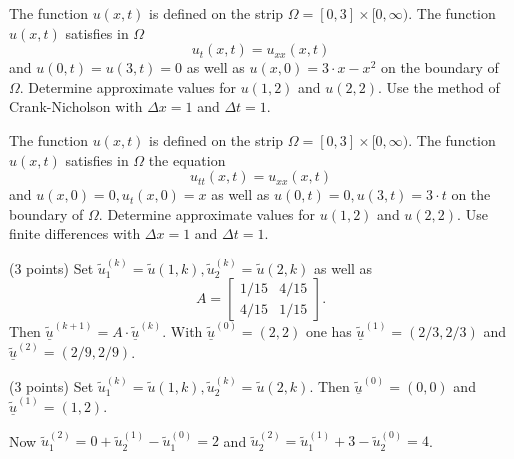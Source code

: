 \begin{teilaufgaben}
\item
The function $u(x,t)$ is defined on the strip
$\Omega = [0, 3] \times [0,\infty)$.
The function $u(x,t)$ satisfies in $\Omega$
\[
u_{t}(x,t) = u_{xx}(x,t)
\]
and $u(0,t) = u(3,t) = 0$ as well as $u(x,0) = 3 \cdot x - x^2$ on the boundary of $\Omega$.
Determine approximate values for $u(1,2)$ and $u(2,2)$. 
Use the method of Crank-Nicholson with $\Delta x = 1$ and $\Delta t = 1.$

\item
The function $u(x,t)$ is defined on the strip $\Omega = [0, 3] \times [0,\infty)$.
The function $u(x,t)$ satisfies in $\Omega$ the equation
\[
u_{tt}(x,t) = u_{xx}(x,t)
\]
and  $u(x,0) = 0, u_t(x,0) = x$ as well as $u(0,t) = 0, u(3,t) = 3 \cdot t$ on the boundary of $\Omega$.
Determine approximate values for $u(1,2)$ and $u(2,2)$. 
Use finite differences with $\Delta x = 1$ and $\Delta t = 1.$
\end{teilaufgaben}

\begin{loesung}
\begin{teilaufgaben}
\item
(3 points) Set $\tilde u_1^{(k)} = \tilde u(1,k), \tilde u_2^{(k)} = \tilde u(2,k)$ as well as
\[
A
=
\left[\begin{array}{rr} 1/15 & 4/15  \\ 4/15 & 1/15  \end{array}\right].
\]
Then $\underline{\tilde u}^{(k+1)} = A \cdot \underline{\tilde u}^{(k)}$.
With $\underline{\tilde u}^{(0)} = (2,2)$ one has $\underline{\tilde u}^{(1)} = (2/3,2/3)$
and $\underline{\tilde u}^{(2)} = (2/9,2/9)$. 

\item
(3 points) Set $\tilde u_1^{(k)} = \tilde u(1,k), \tilde u_2^{(k)} = \tilde u(2,k)$.
Then $\underline{\tilde u}^{(0)} = (0,0)$ and $\underline{\tilde u}^{(1)} = (1,2)$.

Now $\tilde u_1^{(2)} = 0 + \tilde u_2^{(1)} - \tilde u_1^{(0)} = 2$ and
$\tilde u_2^{(2)} = \tilde u_1^{(1)} + 3 - \tilde u_2^{(0)} = 4$.
\qedhere
\end{teilaufgaben}
\end{loesung}

